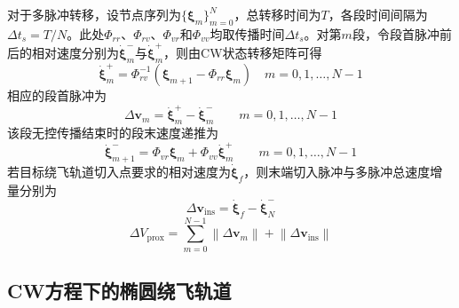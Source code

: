 \documentclass[10.5pt,twocolumn]{aaas}
\begin{document}
对于多脉冲转移，设节点序列为$\{\boldsymbol{\xi}_m\}_{m=0}^{N}$，总转移时间为$T$，各段时间间隔为$\Delta t_s=T/N$。此处$\Phi_{rr}$、$\Phi_{rv}$、$\Phi_{vr}$和$\Phi_{vv}$均取传播时间$\Delta t_s$。对第$m$段，令段首脉冲前后的相对速度分别为$\dot{\boldsymbol{\xi}}_m^-$与$\dot{\boldsymbol{\xi}}_m^+$，则由CW状态转移矩阵可得
\begin{equation}
  \dot{\boldsymbol{\xi}}_m^+
  = \Phi_{rv}^{-1}\left(\boldsymbol{\xi}_{m+1} - \Phi_{rr}\boldsymbol{\xi}_m\right)
  \quad m=0,1,\ldots,N-1
  \label{eq:multi-impulse-post-velocity}
\end{equation}
相应的段首脉冲为
\begin{equation}
  \Delta\boldsymbol{v}_m
  = \dot{\boldsymbol{\xi}}_m^+ - \dot{\boldsymbol{\xi}}_m^-
  \qquad m=0,1,\ldots,N-1
  \label{eq:multi-impulse-segment-dv}
\end{equation}
该段无控传播结束时的段末速度递推为
\begin{equation}
  \dot{\boldsymbol{\xi}}_{m+1}^-
  = \Phi_{vr}\boldsymbol{\xi}_m + \Phi_{vv}\dot{\boldsymbol{\xi}}_m^+
  \qquad m=0,1,\ldots,N-1
  \label{eq:multi-impulse-velocity-recursion}
\end{equation}
若目标绕飞轨道切入点要求的相对速度为$\dot{\boldsymbol{\xi}}_f$，则末端切入脉冲与多脉冲总速度增量分别为
\begin{equation}
  \Delta\boldsymbol{v}_{\mathrm{ins}}
  = \dot{\boldsymbol{\xi}}_f - \dot{\boldsymbol{\xi}}_N^-
  \label{eq:proximity-insertion-dv}
\end{equation}
\begin{equation}
  \Delta V_{\mathrm{prox}}
  = \sum_{m=0}^{N-1}\left\|\Delta\boldsymbol{v}_m\right\|
  + \left\|\Delta\boldsymbol{v}_{\mathrm{ins}}\right\|
  \label{eq:proximity-total-dv}
\end{equation}

\subsection{CW方程下的椭圆绕飞轨道}
\end{document}
